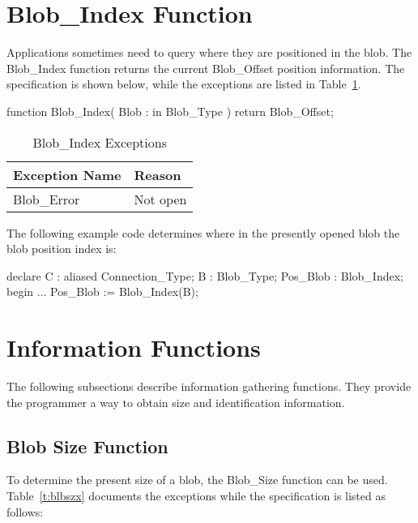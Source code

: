 \documentclass[english,letterpaper]{book}
\begin{document}
\section{Blob\_Index Function}

Applications sometimes need to query where they are positioned in
the blob. The Blob\_Index function returns the current Blob\_Offset
position information. The specification is shown below,
while the exceptions are listed in Table~\ref{t:blbxx}.

\begin{Code}
function Blob_Index(
   Blob : in Blob_Type
) return Blob_Offset;
\end{Code}

\begin{table}
   \begin{center}
      \begin{tabular}{ll}
         Exception Name    &  Reason\\
         \hline 
         Blob\_Error       &  Not open\\
      \end{tabular}
   \end{center}
   \caption{Blob\_Index Exceptions}\label{t:blbxx}
\end{table}

The following example code determines where in the presently opened
blob the blob position index is:

\begin{Example}
declare
   C :        aliased Connection_Type;
   B :        Blob_Type;
   Pos_Blob : Blob_Index;
begin
   ...
   Pos_Blob := Blob_Index(B);
\end{Example}

\section{Information Functions}

The following subsections describe information gathering functions.
They provide the programmer a way to obtain size and identification
information.

\subsection{Blob Size Function\label{Blob Size Function}}

To determine the present size of a blob, the Blob\_Size
function can be used. Table~\ref{t:blbszx} documents the exceptions while the specification
is listed as follows:
\end{document}
